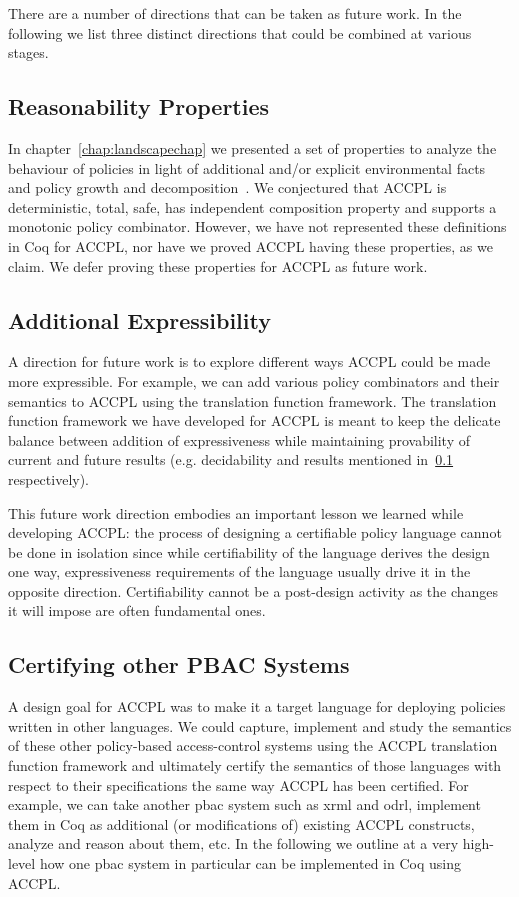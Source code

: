 There are a number of directions that can be taken as future work. In the following we list three distinct directions that could be combined at various stages.

 
\subsection{Reasonability Properties}\label{subsec:reasonprop}

In chapter~\ref{chap:landscapechap} we presented a set of properties to analyze the behaviour of policies in light of additional and/or explicit environmental facts and policy growth and decomposition~\cite{Tschantz}. We conjectured that \ac{ACCPL} is deterministic, total, safe, has independent composition property and supports a monotonic policy combinator. However, we have not represented these definitions in Coq for \ac{ACCPL}, nor have we proved \ac{ACCPL} having these properties, as we claim. We defer proving these properties for \ac{ACCPL} as future work. 

\subsection{Additional Expressibility}

A direction for future work is to explore different ways \ac{ACCPL} could be made more expressible. For example, we can add various policy combinators and their semantics to \ac{ACCPL} using the translation function framework. The translation function framework we have developed for \ac{ACCPL} is meant to keep the delicate balance between addition of expressiveness while maintaining provability of current and future results (e.g. decidability and results mentioned in~\ref{subsec:reasonprop} respectively).

This future work direction embodies an important lesson we learned while developing \ac{ACCPL}: the process of designing a certifiable policy language cannot be done in isolation since while certifiability of the language derives the design one way, expressiveness requirements of the language usually drive it in the opposite direction. Certifiability cannot be a post-design activity as the changes it will impose are often fundamental ones.

\subsection{Certifying other PBAC Systems}

A design goal for \ac{ACCPL} was to make it a target language for deploying policies written in other languages. We could capture, implement and study the semantics of these other policy-based access-control systems using the \ac{ACCPL} translation function framework and ultimately certify the semantics of those languages with respect to their specifications the same way \ac{ACCPL} has been certified. For example, we can take another \ac{pbac} system such as \ac{xrml} and \ac{odrl}, implement them in Coq as additional (or modifications of) existing \ac{ACCPL} constructs, analyze and reason about them, etc. In the following we outline at a very high-level how one \ac{pbac} system in particular can be implemented in Coq using \ac{ACCPL}.


